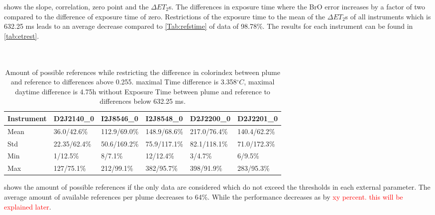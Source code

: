  shows the slope, correlation, zero point and the $\Delta ET_{2}$s. The differences in exposure time where the BrO error increases by a factor of two compared to the difference of exposure time of zero.
Restrictions of the exposure time to the mean of the $\Delta ET_{2}$s of all instruments which is 632.25 ms leads to an average decrease compared to \cref{Tab:refstime} of data of 98.78\%. The results for each instrument can be found in \cref{tab:etrest}.\\
\\
\\
\begin{table}
	\centering
	\begin{tabular}{|p{1.8cm}|p{2.15cm}|p{2.15cm}|p{2.15cm}|p{2.15cm}|p{2.15cm}|}
		Instrument	&D2J2140\_0&I2J8546\_0& I2J8548\_0&D2J2200\_0&D2J2201\_0\\
		\toprule
		Mean&
		36.0/42.6\%&	112.9/69.0\%&
		148.9/68.6\%&	217.0/76.4\%&	140.4/62.2\%\\
		\midrule
		Std&
		22.35/62.4\%&
		50.6/169.2\% &
		75.9/117.1\%&
		82.1/118.1\% &
		71.0/172.3\% \\
		\midrule
		Min&
		1/12.5\%  &
		8/7.1\%  &
		12/12.4\%  &
		3/4.7\%   &
		6/9.5\%  \\
		\midrule
		Max
		&127/75.1\%
		&212/99.1\%
		&382/95.7\%
		&398/91.9\%
		&283/95.3\%\\
		\bottomrule
	\end{tabular}
	\label{tab:restrictall}
	\caption{Amount of possible references while restricting the difference in colorindex  between plume and reference to differences above 0.255. maximal Time difference is 3.358$^{\circ}C$, maximal daytime difference is 4.75h without Exposure Time  between plume and reference to differences below 632.25 ms.}
\end{table}	
 shows the amount of possible references if the only data are considered which do not exceed the thresholds in each external parameter.  The average amount of available references per plume decreases to 64\%. While the performance decreases as by \textcolor{red}{xy percent. this will be explained later}.


